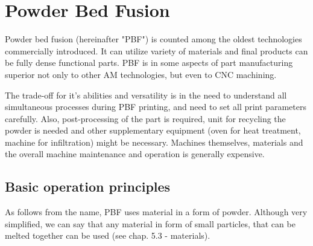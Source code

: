 \documentclass[a4paper, 11pt, reqno]{report}
\begin{document}
\chapter{Powder Bed Fusion}
Powder bed fusion (hereinafter "PBF") is counted among the oldest technologies commercially introduced. It can utilize variety of materials and final products can be fully dense functional parts. PBF is in some aspects of part manufacturing superior not only to other AM technologies, but even to CNC machining.

	The trade-off for it's abilities and versatility is in the need to understand all simultaneous processes during PBF printing, and need to set all print parameters carefully. Also, post-processing of the part is required, unit for recycling the powder is needed and other supplementary equipment (oven for heat treatment, machine for infiltration) might be necessary. Machines themselves, materials and the overall machine maintenance and operation is generally expensive.

\section{Basic operation principles}
As follows from the name, PBF uses material in a form of powder. Although very simplified, we can say that any material in form of small particles, that can be melted together can be used (see chap. 5.3 - materials).
\end{document}
